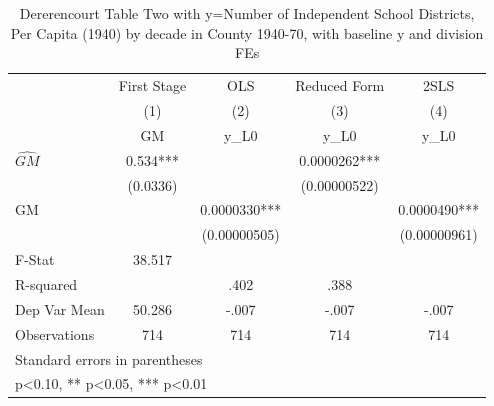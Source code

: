 \begin{table}[htbp]\centering
\def\sym#1{\ifmmode^{#1}\else\(^{#1}\)\fi}
\caption{Dererencourt Table Two with y=Number of Independent School Districts, Per Capita (1940) by decade in County 1940-70, with baseline y and division FEs}
\begin{tabular}{l*{4}{c}}
\toprule
                    & First Stage   &         OLS   &Reduced Form   &        2SLS   \\
                    &\multicolumn{1}{c}{(1)}&\multicolumn{1}{c}{(2)}&\multicolumn{1}{c}{(3)}&\multicolumn{1}{c}{(4)}\\
                    &\multicolumn{1}{c}{GM}&\multicolumn{1}{c}{y\_L0}&\multicolumn{1}{c}{y\_L0}&\multicolumn{1}{c}{y\_L0}\\
\midrule
$\hat{GM}$          &       0.534***&               &   0.0000262***&               \\
                    &    (0.0336)   &               &(0.00000522)   &               \\
\addlinespace
GM                  &               &   0.0000330***&               &   0.0000490***\\
                    &               &(0.00000505)   &               &(0.00000961)   \\
\midrule
F-Stat              &      38.517   &               &               &               \\
R-squared           &               &        .402   &        .388   &               \\
Dep Var Mean        &      50.286   &       -.007   &       -.007   &       -.007   \\
Observations        &         714   &         714   &         714   &         714   \\
\bottomrule
\multicolumn{5}{l}{\footnotesize Standard errors in parentheses}\\
\multicolumn{5}{l}{\footnotesize * p<0.10, ** p<0.05, *** p<0.01}\\
\end{tabular}
\end{table}
